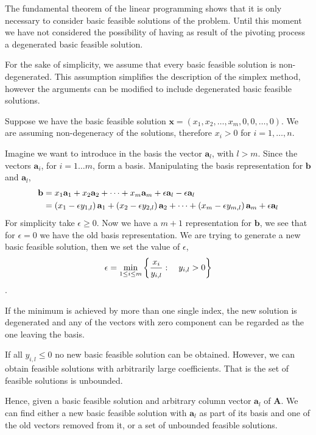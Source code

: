 The fundamental theorem of the linear programming shows that it is only necessary to consider basic feasible solutions of the problem. Until this moment we have not considered the possibility of having as result of the pivoting process a degenerated basic feasible solution. 

For the sake of simplicity, we assume that every basic feasible solution is non-degenerated. This assumption simplifies the description of the simplex method, however the arguments can be modified to include degenerated basic feasible solutions.

Suppose we have the basic feasible solution $\mathbf{x}=\left(x_1, x_2, \dots, x_m, 0,0, \dots, 0\right)$. We are assuming non-degeneracy of the solutions, therefore $x_i>0$ for $i=1,\dots, n$. 

Imagine we want to introduce in the basis the vector $\mathbf{a}_l$, with $l>m$. Since the vectors $\mathbf{a}_i$, for $i=1\dots m$, form a basis. Manipulating the basis representation for $\mathbf{b}$ and $\mathbf{a}_l$, 
\begin{align*}
	\mathbf{b}&=x_1\mathbf{a}_1+x_2\mathbf{a}_2+\dots+x_m\mathbf{a}_m + \epsilon \mathbf{a}_l - \epsilon\mathbf{a}_l\\
	&=\left( x_1-\epsilon y_{1,l} \right)\mathbf{a}_1+\left( x_2-\epsilon y_{2, l} \right)\mathbf{a}_2+\dots+\left( x_m-\epsilon y_{m, l} \right)\mathbf{a}_m +\epsilon \mathbf{a}_l
\end{align*} 
For simplicity take $\epsilon \geq 0$. Now we have a $m+1$ representation for $\mathbf{b}$, we see that for $\epsilon=0$ we have the old basis representation. We are trying to generate a new basic feasible solution, then we set the value of $\epsilon$, \begin{equation*}
	\epsilon=\min_{1\leq i\leq m}\left\lbrace \frac{x_i}{y_{i,l}}: \quad y_{i,l}>0 \right\rbrace
\end{equation*}.

If the minimum is achieved by more than one single index, the new solution is degenerated and any of the vectors with zero component can be regarded as the one leaving the basis.

If all $y_{i,l}\leq 0$ no new basic feasible solution can be obtained. However, we can obtain feasible solutions with arbitrarily large coefficients. That is the set of feasible solutions is unbounded.  

Hence, given a basic feasible solution and arbitrary column vector $\mathbf{a}_l$ of $\mathbf{A}$. We can find either a new basic feasible solution with $\mathbf{a}_l$ as part of its basis and one of the old vectors removed from it, or a set of unbounded feasible solutions. 

